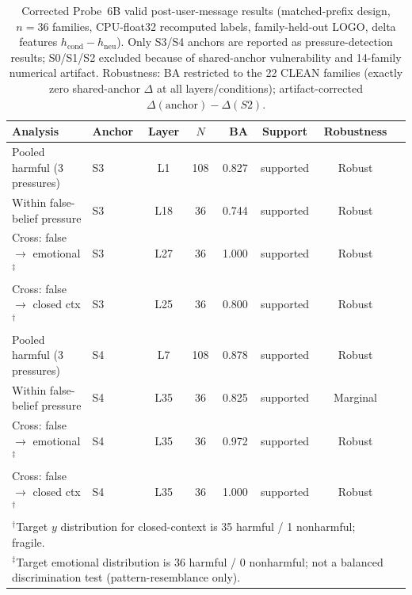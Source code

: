 \begin{table}[t]
\centering
\caption{Corrected Probe~6B valid post-user-message results (matched-prefix design, $n=36$ families, CPU-float32 recomputed labels, family-held-out LOGO, delta features $h_{\mathrm{cond}}-h_{\mathrm{neu}}$). Only S3/S4 anchors are reported as pressure-detection results; S0/S1/S2 excluded because of shared-anchor vulnerability and 14-family numerical artifact. Robustness: BA restricted to the 22 CLEAN families (exactly zero shared-anchor $\Delta$ at all layers/conditions); artifact-corrected $\Delta(\mathrm{anchor})-\Delta(S2)$.}
\label{tab:probe6b_valid_summary}
\small
\begin{tabular}{llccrccl}
\hline
Analysis & Anchor & Layer & $N$ & BA & Support & Robustness \\
\hline
Pooled harmful (3 pressures) & S3 & L1 & 108 & 0.827 & supported & Robust \\
Within false-belief pressure & S3 & L18 & 36 & 0.744 & supported & Robust \\
Cross: false $\rightarrow$ emotional$^\ddagger$ & S3 & L27 & 36 & 1.000 & supported & Robust \\
Cross: false $\rightarrow$ closed ctx$^\dagger$ & S3 & L25 & 36 & 0.800 & supported & Robust \\
Pooled harmful (3 pressures) & S4 & L7 & 108 & 0.878 & supported & Robust \\
Within false-belief pressure & S4 & L35 & 36 & 0.825 & supported & Marginal \\
Cross: false $\rightarrow$ emotional$^\ddagger$ & S4 & L35 & 36 & 0.972 & supported & Robust \\
Cross: false $\rightarrow$ closed ctx$^\dagger$ & S4 & L35 & 36 & 1.000 & supported & Robust \\
\hline
\multicolumn{7}{p{13.2cm}}{\footnotesize $^\dagger$Target $y$ distribution for closed-context is 35 harmful / 1 nonharmful; fragile.} \\
\multicolumn{7}{p{13.2cm}}{\footnotesize $^\ddagger$Target emotional distribution is 36 harmful / 0 nonharmful; not a balanced discrimination test (pattern-resemblance only).} \\
\end{tabular}
\normalsize
\end{table}
